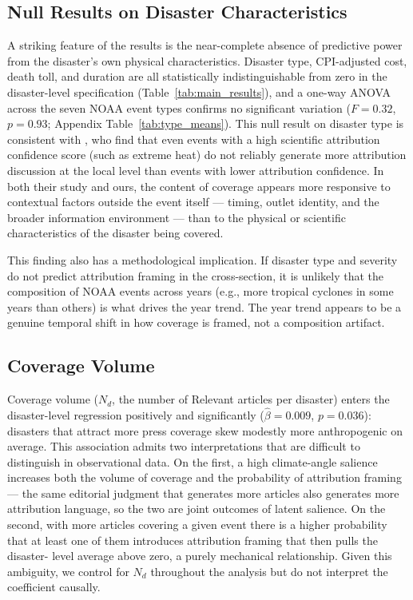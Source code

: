 \documentclass[12pt]{article}
\begin{document}
\subsection*{Null Results on Disaster Characteristics}

A striking feature of the results is the near-complete absence of
predictive power from the disaster's own physical characteristics.
Disaster type, CPI-adjusted cost, death toll, and duration are all
statistically indistinguishable from zero in the disaster-level
specification (Table~\ref{tab:main_results}), and a one-way ANOVA
across the seven NOAA event types confirms no significant variation
($F = 0.32$, $p = 0.93$; Appendix Table~\ref{tab:type_means}).  This null
result on disaster type is consistent with \citet{boudet2020}, who
find that even events with a high scientific attribution confidence
score (such as extreme heat) do not reliably generate more
attribution discussion at the local level than events with lower
attribution confidence.  In both their study and ours, the content of
coverage appears more responsive to contextual factors outside the
event itself --- timing, outlet identity, and the broader information
environment --- than to the physical or scientific characteristics of
the disaster being covered.

This finding also has a methodological implication.  If disaster type
and severity do not predict attribution framing in the cross-section,
it is unlikely that the composition of NOAA events across years (e.g.,
more tropical cyclones in some years than others) is what drives the
year trend.  The year trend appears to be a genuine temporal shift in
how coverage is framed, not a composition artifact.

\subsection*{Coverage Volume}

Coverage volume ($N_d$, the number of Relevant articles per disaster)
enters the disaster-level regression positively and significantly
($\hat\beta = 0.009$, $p = 0.036$): disasters that attract more press
coverage skew modestly more anthropogenic on average.  This
association admits two interpretations that are difficult to
distinguish in observational data.  On the first, a high climate-angle
salience increases both the volume of coverage and the probability of
attribution framing --- the same editorial judgment that generates more
articles also generates more attribution language, so the two are joint
outcomes of latent salience.  On the second, with more articles
covering a given event there is a higher probability that at least one
of them introduces attribution framing that then pulls the disaster-
level average above zero, a purely mechanical relationship.  Given this
ambiguity, we control for $N_d$ throughout the analysis but do not
interpret the coefficient causally.
\end{document}
